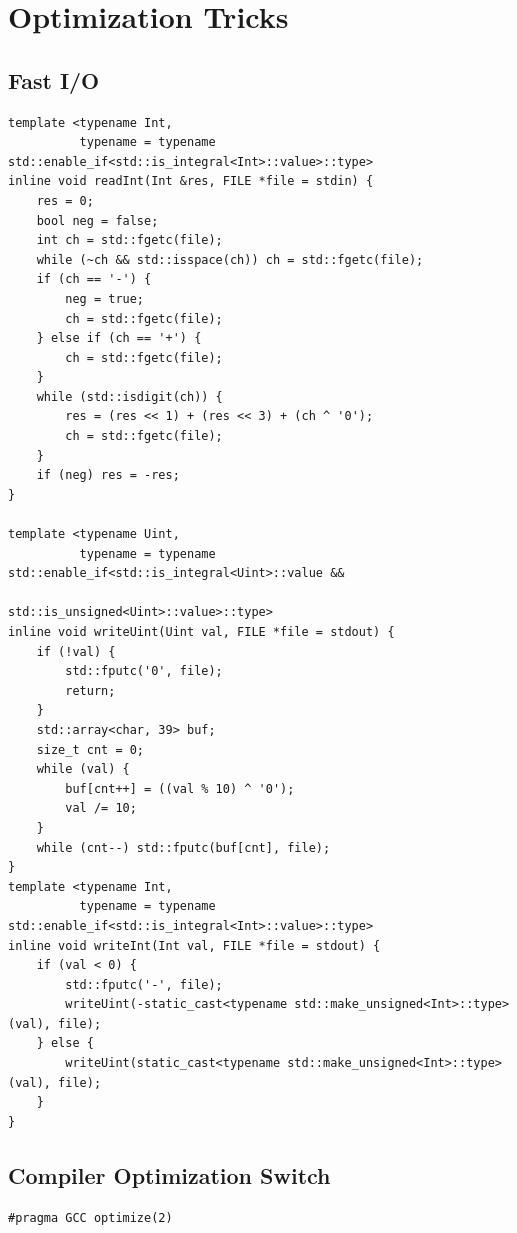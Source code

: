 \documentclass[UTF8]{article}
\begin{document}
\section{Optimization Tricks}
\subsection{Fast I/O}
\begin{verbatim}
template <typename Int,
		  typename = typename std::enable_if<std::is_integral<Int>::value>::type>
inline void readInt(Int &res, FILE *file = stdin) {
	res = 0;
	bool neg = false;
	int ch = std::fgetc(file);
	while (~ch && std::isspace(ch)) ch = std::fgetc(file);
	if (ch == '-') {
		neg = true;
		ch = std::fgetc(file);
	} else if (ch == '+') {
		ch = std::fgetc(file);
	}
	while (std::isdigit(ch)) {
		res = (res << 1) + (res << 3) + (ch ^ '0');
		ch = std::fgetc(file);
	}
	if (neg) res = -res;
}

template <typename Uint,
		  typename = typename std::enable_if<std::is_integral<Uint>::value &&
											 std::is_unsigned<Uint>::value>::type>
inline void writeUint(Uint val, FILE *file = stdout) {
	if (!val) {
		std::fputc('0', file);
		return;
	}
	std::array<char, 39> buf;
	size_t cnt = 0;
	while (val) {
		buf[cnt++] = ((val % 10) ^ '0');
		val /= 10;
	}
	while (cnt--) std::fputc(buf[cnt], file);
}
template <typename Int,
		  typename = typename std::enable_if<std::is_integral<Int>::value>::type>
inline void writeInt(Int val, FILE *file = stdout) {
	if (val < 0) {
		std::fputc('-', file);
		writeUint(-static_cast<typename std::make_unsigned<Int>::type>(val), file);
	} else {
		writeUint(static_cast<typename std::make_unsigned<Int>::type>(val), file);
	}
}
\end{verbatim}

\subsection{Compiler Optimization Switch}
\begin{verbatim}
#pragma GCC optimize(2)
\end{verbatim}
\end{document}
